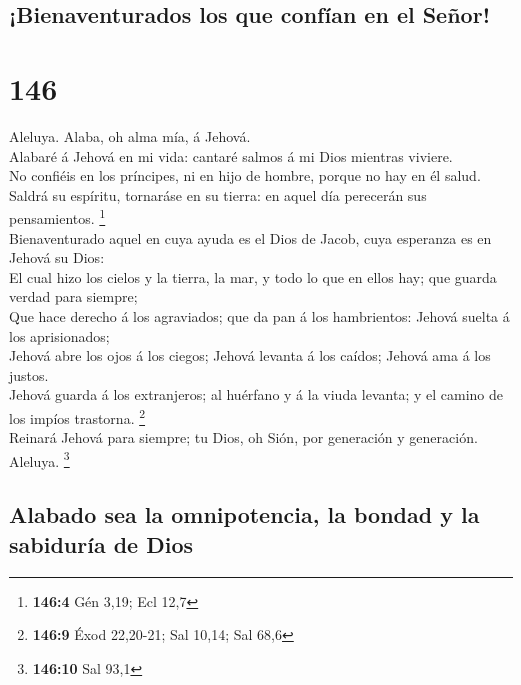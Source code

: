 \hypertarget{bienaventurados-los-que-confuxedan-en-el-seuxf1or}{%
\subsection{¡Bienaventurados los que confían en el
Señor!}\label{bienaventurados-los-que-confuxedan-en-el-seuxf1or}}

\hypertarget{section-145}{%
\section{146}\label{section-145}}

 Aleluya. Alaba, oh alma mía, á Jehová.\\
 Alabaré á Jehová en mi vida: cantaré salmos á mi Dios
mientras viviere.\\
 No confiéis en los príncipes, ni en hijo de hombre, porque
no hay en él salud.\\
 Saldrá su espíritu, tornaráse en su tierra: en aquel día
perecerán sus pensamientos. \footnote{\textbf{146:4} Gén 3,19; Ecl 12,7}\\
 Bienaventurado aquel en cuya ayuda es el Dios de Jacob,
cuya esperanza es en Jehová su Dios:\\
 El cual hizo los cielos y la tierra, la mar, y todo lo que
en ellos hay; que guarda verdad para siempre;\\
 Que hace derecho á los agraviados; que da pan á los
hambrientos: Jehová suelta á los aprisionados;\\
 Jehová abre los ojos á los ciegos; Jehová levanta á los
caídos; Jehová ama á los justos.\\
 Jehová guarda á los extranjeros; al huérfano y á la viuda
levanta; y el camino de los impíos trastorna. \footnote{\textbf{146:9}
  Éxod 22,20-21; Sal 10,14; Sal 68,6}\\
 Reinará Jehová para siempre; tu Dios, oh Sión, por
generación y generación. Aleluya. \footnote{\textbf{146:10} Sal 93,1}

\hypertarget{alabado-sea-la-omnipotencia-la-bondad-y-la-sabiduruxeda-de-dios}{%
\subsection{Alabado sea la omnipotencia, la bondad y la sabiduría de
Dios}\label{alabado-sea-la-omnipotencia-la-bondad-y-la-sabiduruxeda-de-dios}}

